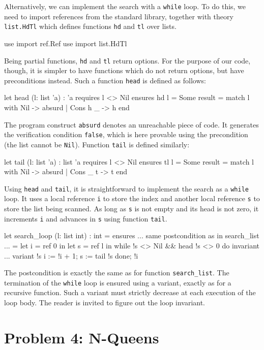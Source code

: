 Alternatively, we can implement the search with a \texttt{while} loop.
To do this, we need to import references from the standard library,
together with theory \texttt{list.HdTl} which defines functions
\texttt{hd} and \texttt{tl} over lists.
\begin{whycode}
  use import ref.Ref
  use import list.HdTl
\end{whycode}
Being partial functions, \texttt{hd} and \texttt{tl} return options.
For the purpose of our code, though, it is simpler to have functions
which do not return options, but have preconditions instead. Such a
function \texttt{head} is defined as follows:
\begin{whycode}
  let head (l: list 'a) : 'a
    requires { l <> Nil } ensures { hd l = Some result }
  = match l with Nil -> absurd | Cons h _ -> h end
\end{whycode}
The program construct \texttt{absurd} denotes an unreachable piece of
code. It generates the verification condition \texttt{false}, which is
here provable using the precondition (the list cannot be \texttt{Nil}).
Function \texttt{tail} is defined similarly:
\begin{whycode}
  let tail (l: list 'a) : list 'a
    requires { l <> Nil } ensures { tl l = Some result }
  = match l with Nil -> absurd | Cons _ t -> t end
\end{whycode}
Using \texttt{head} and \texttt{tail}, it is straightforward to
implement the search as a \texttt{while} loop.
It uses a local reference \texttt{i} to store the index and another
local reference \texttt{s} to store the list being scanned.
As long as \texttt{s} is not empty and its head is not zero, it
increments \texttt{i} and advances in \texttt{s} using function \texttt{tail}.
\begin{whycode}
  let search_loop (l: list int) : int =
    ensures { ... same postcondition as in search_list ... }
  = let i = ref 0 in
    let s = ref l in
    while !s <> Nil && head !s <> 0 do
      invariant { ... }
      variant   { !s }
      i := !i + 1;
      s := tail !s
    done;
    !i
\end{whycode}
The postcondition is exactly the same as for function \verb|search_list|.
The termination of the \texttt{while} loop is ensured using a variant,
exactly as for a recursive function. Such a variant must strictly decrease at
each execution of the loop body. The reader is invited to figure out
the loop invariant.

\section{Problem 4: N-Queens}


